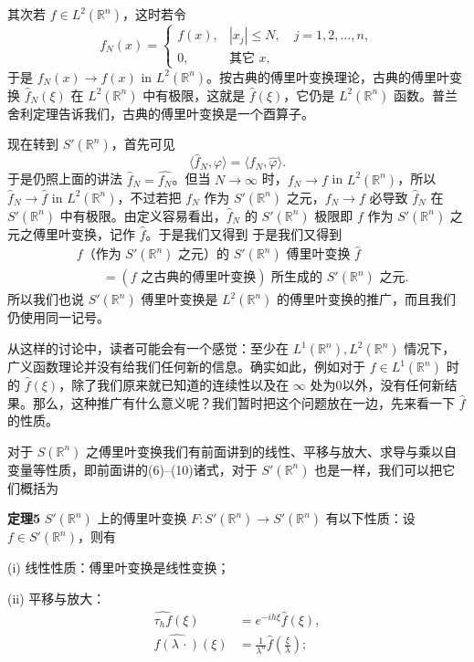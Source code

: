 其次若 $f\in L^2(\mathbb R^n)$，这时若令
\[
 f_N(x)=\begin{cases}
 f(x),&|x_j|\le N,\quad j=1,2,\ldots,n,\\
 0,&\text{其它 }x,
 \end{cases}
\]
于是 $f_N(x)\to f(x)$ in $L^2(\mathbb R^n)$。按古典的傅里叶变换理论，古典的傅里叶变换 $\widehat f_N(\xi)$ 在 $L^2(\mathbb R^n)$ 中有极限，这就是 $\widehat f(\xi)$，它仍是 $L^2(\mathbb R^n)$ 函数。普兰舍利定理告诉我们，古典的傅里叶变换是一个酉算子。

现在转到 $S'(\mathbb R^n)$，首先可见
\[
 \langle\widehat f_N,\varphi\rangle=\langle f_N,\widehat\varphi\rangle.
\]
于是仍照上面的讲法 $\widehat f_N=\widehat{f_N}$。但当 $N\to\infty$ 时，$f_N\to f$ in $L^2(\mathbb R^n)$，所以 $\widehat f_N\to\widehat f$ in $L^2(\mathbb R^n)$，不过若把 $f_N$ 作为 $S'(\mathbb R^n)$ 之元，$f_N\to f$ 必导致 $\widehat f_N$ 在 $S'(\mathbb R^n)$ 中有极限。由定义容易看出，$\widehat f_N$ 的 $S'(\mathbb R^n)$ 极限即 $f$ 作为 $S'(\mathbb R^n)$ 之元之傅里叶变换，记作 $\widehat f$。于是我们又得到
于是我们又得到
\[
 \begin{aligned}
 &f\text{（作为 }S'(\mathbb R^n)\text{ 之元）的 }S'(\mathbb R^n)\text{ 傅里叶变换 }\widehat f\\
 &\qquad=(f\text{ 之古典的傅里叶变换})\text{ 所生成的 }S'(\mathbb R^n)\text{ 之元}.
 \end{aligned}
\]
所以我们也说 $S'(\mathbb R^n)$ 傅里叶变换是 $L^2(\mathbb R^n)$ 的傅里叶变换的推广，而且我们仍使用同一记号。

从这样的讨论中，读者可能会有一个感觉：至少在 $L^1(\mathbb R^n),L^2(\mathbb R^n)$ 情况下，广义函数理论并没有给我们任何新的信息。确实如此，例如对于 $f\in L^1(\mathbb R^n)$ 时的 $\widehat f(\xi)$，除了我们原来就已知道的连续性以及在 $\infty$ 处为0以外，没有任何新结果。那么，这种推广有什么意义呢？我们暂时把这个问题放在一边，先来看一下 $\widehat f$ 的性质。

对于 $S(\mathbb R^n)$ 之傅里叶变换我们有前面讲到的线性、平移与放大、求导与乘以自变量等性质，即前面讲的(6)--(10)诸式，对于 $S'(\mathbb R^n)$ 也是一样，我们可以把它们概括为

\noindent\textbf{定理5}\quad
$S'(\mathbb R^n)$ 上的傅里叶变换 $F:S'(\mathbb R^n)\to S'(\mathbb R^n)$ 有以下性质：设 $f\in S'(\mathbb R^n)$，则有

(i) 线性性质：傅里叶变换是线性变换；

(ii) 平移与放大：
\begin{align}
 \widehat{\tau_hf}(\xi)&=e^{-ih\xi}\widehat f(\xi),
 \tag{25a}\\
 \widehat{f(\lambda\,\cdot)}(\xi)&=\frac1{\lambda^n}\widehat f\!\left(\frac\xi\lambda\right);
 \tag{25b}
\end{align}

